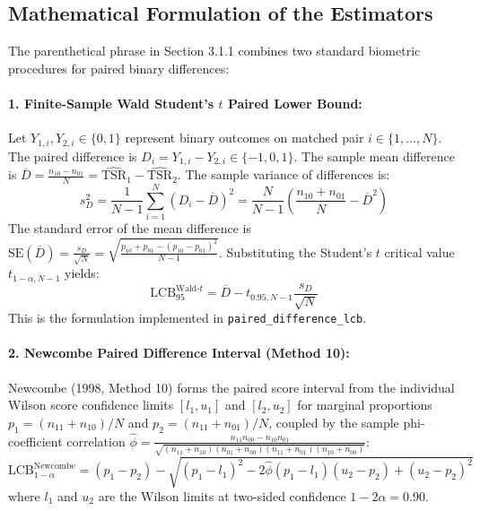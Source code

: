 \documentclass[10pt,a4paper]{article}
\begin{document}
\subsection{Mathematical Formulation of the Estimators}
The parenthetical phrase in Section 3.1.1 combines two standard biometric procedures for paired binary differences:

\paragraph{1. Finite-Sample Wald Student's $t$ Paired Lower Bound:}
Let $Y_{1, i}, Y_{2, i} \in \{0, 1\}$ represent binary outcomes on matched pair $i \in \{1, \dots, N\}$. The paired difference is $D_i = Y_{1, i} - Y_{2, i} \in \{-1, 0, 1\}$. The sample mean difference is $\overline{D} = \frac{n_{10} - n_{01}}{N} = \widehat{\mathrm{TSR}}_1 - \widehat{\mathrm{TSR}}_2$. The sample variance of differences is:
\begin{equation}
s_D^2 = \frac{1}{N-1}\sum_{i=1}^N (D_i - \overline{D})^2 = \frac{N}{N-1}\left( \frac{n_{10} + n_{01}}{N} - \overline{D}^2 \right)
\end{equation}
The standard error of the mean difference is $\mathrm{SE}(\overline{D}) = \frac{s_D}{\sqrt{N}} = \sqrt{\frac{p_{10} + p_{01} - (p_{10} - p_{01})^2}{N-1}}$. Substituting the Student's $t$ critical value $t_{1-\alpha, N-1}$ yields:
\begin{equation}
\mathrm{LCB}_{95}^{\text{Wald-}t} = \overline{D} - t_{0.95, N-1} \frac{s_D}{\sqrt{N}}
\end{equation}
This is the formulation implemented in \texttt{paired\_difference\_lcb}.

\paragraph{2. Newcombe Paired Difference Interval (Method 10):}
Newcombe (1998, Method 10) forms the paired score interval from the individual Wilson score confidence limits $[l_1, u_1]$ and $[l_2, u_2]$ for marginal proportions $p_1 = (n_{11} + n_{10})/N$ and $p_2 = (n_{11} + n_{01})/N$, coupled by the sample phi-coefficient correlation $\hat{\phi} = \frac{n_{11} n_{00} - n_{10} n_{01}}{\sqrt{(n_{11} + n_{10})(n_{01} + n_{00})(n_{11} + n_{01})(n_{10} + n_{00})}}$:
\begin{equation}
\mathrm{LCB}_{1-\alpha}^{\text{Newcombe}} = (p_1 - p_2) - \sqrt{(p_1 - l_1)^2 - 2\hat{\phi}(p_1 - l_1)(u_2 - p_2) + (u_2 - p_2)^2}
\end{equation}
where $l_1$ and $u_2$ are the Wilson limits at two-sided confidence $1 - 2\alpha = 0.90$.
\end{document}
